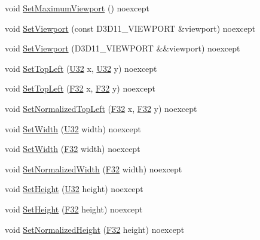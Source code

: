 \begin{DoxyCompactItemize}
\item 
void \hyperlink{structmage_1_1_viewport_a5af006b8ec0464a924c3822265727ee2}{Set\+Maximum\+Viewport} () noexcept
\item 
void \hyperlink{structmage_1_1_viewport_a12a0d7b74ce81786e38f08d399acafc6}{Set\+Viewport} (const D3\+D11\+\_\+\+V\+I\+E\+W\+P\+O\+RT \&viewport) noexcept
\item 
void \hyperlink{structmage_1_1_viewport_a12c41f937452bb1897558f0126947b22}{Set\+Viewport} (D3\+D11\+\_\+\+V\+I\+E\+W\+P\+O\+RT \&\&viewport) noexcept
\item 
void \hyperlink{structmage_1_1_viewport_a14f63922d0bd2613b3fc2b86683f13a7}{Set\+Top\+Left} (\hyperlink{namespacemage_a41c104c036fba3756a74e19f793eeaa1}{U32} x, \hyperlink{namespacemage_a41c104c036fba3756a74e19f793eeaa1}{U32} y) noexcept
\item 
void \hyperlink{structmage_1_1_viewport_a982a30c583445f04516cfae876667e62}{Set\+Top\+Left} (\hyperlink{namespacemage_aa97e833b45f06d60a0a9c4fc22ae02c0}{F32} x, \hyperlink{namespacemage_aa97e833b45f06d60a0a9c4fc22ae02c0}{F32} y) noexcept
\item 
void \hyperlink{structmage_1_1_viewport_a6f85757d3b7e09e9e7cb72c201fd0cd4}{Set\+Normalized\+Top\+Left} (\hyperlink{namespacemage_aa97e833b45f06d60a0a9c4fc22ae02c0}{F32} x, \hyperlink{namespacemage_aa97e833b45f06d60a0a9c4fc22ae02c0}{F32} y) noexcept
\item 
void \hyperlink{structmage_1_1_viewport_a13f5587df2929ca0368e4434a3a45753}{Set\+Width} (\hyperlink{namespacemage_a41c104c036fba3756a74e19f793eeaa1}{U32} width) noexcept
\item 
void \hyperlink{structmage_1_1_viewport_a377016fb769c86677d7a17c2b19960f3}{Set\+Width} (\hyperlink{namespacemage_aa97e833b45f06d60a0a9c4fc22ae02c0}{F32} width) noexcept
\item 
void \hyperlink{structmage_1_1_viewport_af79a62d7996eb67cf9be99e3e7258f6a}{Set\+Normalized\+Width} (\hyperlink{namespacemage_aa97e833b45f06d60a0a9c4fc22ae02c0}{F32} width) noexcept
\item 
void \hyperlink{structmage_1_1_viewport_abe55d91495584c60ff1bc91a7f286329}{Set\+Height} (\hyperlink{namespacemage_a41c104c036fba3756a74e19f793eeaa1}{U32} height) noexcept
\item 
void \hyperlink{structmage_1_1_viewport_a70a89b84a3dbe79475e10b4a61c0a34c}{Set\+Height} (\hyperlink{namespacemage_aa97e833b45f06d60a0a9c4fc22ae02c0}{F32} height) noexcept
\item 
void \hyperlink{structmage_1_1_viewport_ad1516859277f8d872ce59e24dd525d5d}{Set\+Normalized\+Height} (\hyperlink{namespacemage_aa97e833b45f06d60a0a9c4fc22ae02c0}{F32} height) noexcept

\end{DoxyCompactItemize}
